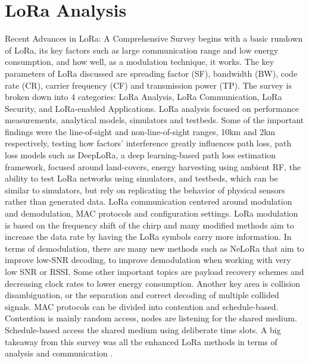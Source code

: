 \documentclass[sigsmall]{acmart}
\begin{document}
\section*{LoRa Analysis}
Recent Advances in LoRa: A Comprehensive Survey begins with a basic rundown of LoRa, its key factors such as large communication range and low energy consumption, and how well, as a modulation technique, it works. The key parameters of LoRa discussed are spreading factor (SF), bandwidth (BW), code rate (CR), carrier frequency (CF) and transmission power (TP). The survey is broken down into 4 categories: LoRa Analysis, LoRa Communication, LoRa Security, and LoRa-enabled Applications.
LoRa analysis focused on performance measurements, analytical models, simulators and testbeds. Some of the important findings were the line-of-sight and non-line-of-sight ranges, 10km and 2km respectively, testing how factors’ interference greatly influences path loss, path loss models such as DeepLoRa, a deep learning-based path loss estimation framework, focused around land-covers, energy harvesting using ambient RF, the ability to test LoRa networks using simulators, and testbeds, which can be similar to simulators, but rely on replicating the behavior of physical sensors rather than generated data.
LoRa communication centered around modulation and demodulation, MAC protocols and configuration settings. LoRa modulation is based on the frequency shift of the chirp and many modified methods aim to increase the data rate by having the LoRa symbols carry more information. In terms of demodulation, there are many new methods such as NeLoRa that aim to improve low-SNR decoding, to improve demodulation when working with very low SNR or RSSI. Some other important topics are payload recovery schemes and decreasing clock rates to lower energy consumption. Another key area is collision disambiguation, or the separation and correct decoding of multiple collided signals. MAC protocols can be divided into contention and schedule-based. Contention is mainly random access, nodes are listening for the shared medium. Schedule-based access the shared medium using deliberate time slots. A big takeaway from this survey was all the enhanced LoRa methods in terms of analysis and communication \cite{sun2022recent}.
\end{document}
